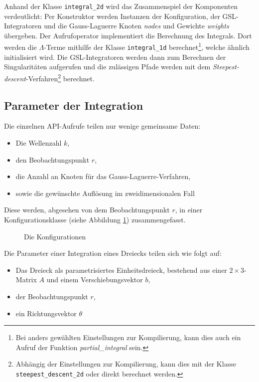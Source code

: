 Anhand der Klasse \texttt{integral\_2d} wird das Zusammenspiel der Komponenten verdeutlicht:
Per Konstruktor werden Instanzen der Konfiguration, der GSL-Integratoren und die Gauss-Laguerre Knoten \textit{nodes} und Gewichte \textit{weights} übergeben.
Der Aufrufoperator implementiert die Berechnung des Integrals. Dort werden die $\Lambda$-Terme mithilfe der Klasse
\texttt{integral\_1d} berechnet\footnote{Bei anders gewählten Einstellungen zur Kompilierung, kann dies auch ein Aufruf der Funktion \textit{partial\_integral} sein.}, welche ähnlich initialisiert wird. Die GSL-Integratoren werden dann zum Berechnen der Singularitäten aufgerufen und die zulässigen Pfade werden mit 
dem \textit{Steepest-descent}-Verfahren\footnote{Abhängig der Einstellungen zur Kompilierung, kann dies mit der Klasse \texttt{steepest\_descent\_2d} oder direkt berechnet werden.} berechnet. 

\pagebreak

\subsection{Parameter der Integration}

Die einzelnen API-Aufrufe teilen nur wenige gemeinsame Daten:
\begin{itemize}
    \item Die Wellenzahl $k$,
    \item den Beobachtungspunkt $r$,
    \item die Anzahl an Knoten für das Gauss-Laguerre-Verfahren,
    \item sowie die gewünschte Auflösung im zweidimensionalen Fall
\end{itemize}
Diese werden, abgesehen von dem Beobachtungspunkt $r$, in einer Konfigurationsklasse (siehe Abbildung \ref{configuration}) zusammengefasst.

\begin{figure}
    
    \caption{Die Konfigurationen}\label{configuration}
\end{figure}


Die Parameter einer Integration eines Dreiecks teilen sich wie folgt auf:

\begin{itemize}
    \item Das Dreieck als parametrisiertes Einheitsdreieck, bestehend aus einer $2\times 3$-Matrix $A$ und einem Verschiebungsvektor $b$,
    \item der Beobachtungspunkt $r$,
    \item ein Richtungsvektor $\theta$
\end{itemize}

